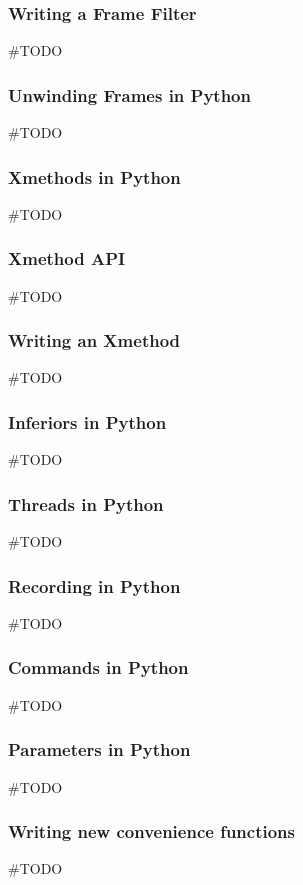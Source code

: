 \subsubsection{Writing a Frame Filter}
\#TODO

\subsubsection{Unwinding Frames in Python}
\#TODO

\subsubsection{Xmethods in Python}
\#TODO

\subsubsection{Xmethod API}
\#TODO

\subsubsection{Writing an Xmethod}
\#TODO

\subsubsection{Inferiors in Python}
\#TODO

\subsubsection{Threads in Python}
\#TODO

\subsubsection{Recording in Python}
\#TODO

\subsubsection{Commands in Python}
\#TODO

\subsubsection{Parameters in Python}
\#TODO

\subsubsection{Writing new convenience functions}
\#TODO

